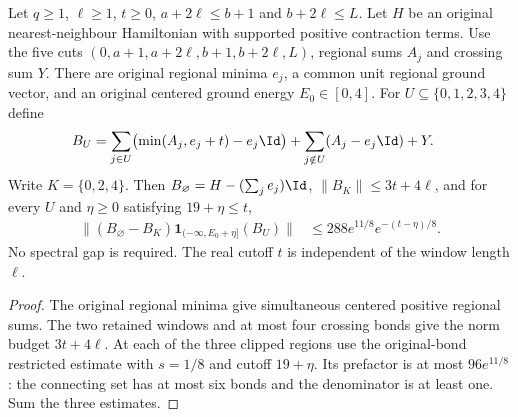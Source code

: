 \begin{lemma}
    \label{lem:five_region_independent_residual}
    \leanok
    Let $q\ge1$, $\ell\ge1$, $t\ge0$, $a+2\ell\le b+1$ and
    $b+2\ell\le L$. Let $H$ be an original nearest-neighbour Hamiltonian
    with supported positive contraction terms. Use the five cuts
    $(0,a+1,a+2\ell,b+1,b+2\ell,L)$, regional sums $A_j$ and crossing sum $Y$.
    There are original regional minima $e_j$, a common unit regional
    ground vector, and an original centered ground energy $E_0\in[0,4]$.
    For $U\subseteq\{0,1,2,3,4\}$ define
    \begin{align}
        B_U & =\sum_{j\in U}\bigl(\min(A_j,e_j+t)-e_j\Id\bigr)
        +\sum_{j\notin U}(A_j-e_j\Id)+Y.
        \label{eq:five_region_independent_clipping}
    \end{align}
    Write $K=\{0,2,4\}$. Then
    $B_\varnothing=H-(\sum_j e_j)\Id$, $\|B_K\|\le3t+4\ell$, and
    for every $U$ and $\eta\ge0$ satisfying $19+\eta\le t$,
    \begin{align}
        \bigl\|(B_\varnothing-B_K)
        \mathbf1_{(-\infty,E_0+\eta]}(B_U)\bigr\|
         & \le288e^{11/8}e^{-(t-\eta)/8}.
    \end{align}
    No spectral gap is required. The real cutoff $t$ is independent of
    the window length $\ell$.
\end{lemma}
\begin{proof}\leanok
    The original regional minima give simultaneous centered positive
    regional sums. The two retained windows and at most four crossing
    bonds give the norm budget $3t+4\ell$.
    At each of the three clipped regions use the original-bond restricted
    estimate with $s=1/8$ and cutoff $19+\eta$.
    Its prefactor is at most $96e^{11/8}$: the connecting set has at most
    six bonds and the denominator is at least one. Sum the three estimates.
\end{proof}

